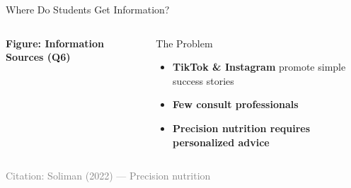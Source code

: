 \documentclass[aspectratio=169, 12pt]{beamer}
\begin{document}
\begin{frame}{Where Do Students Get Information?}
  \begin{columns}[T]
    \begin{center}
      \textbf{Figure: Information Sources (Q6)}
    \end{center}
    
    \begin{alertblock}{The Problem}
      \begin{itemize}
        \item \textbf{TikTok \& Instagram} promote simple success stories
        \item \textbf{Few consult professionals}
        \item \textbf{Precision nutrition requires personalized advice}
      \end{itemize}
    \end{alertblock}
  \end{columns}
  
  \vspace{0.3cm}
  \tiny \textcolor{gray}{Citation: Soliman (2022) — Precision nutrition}
\end{frame}
\end{document}
